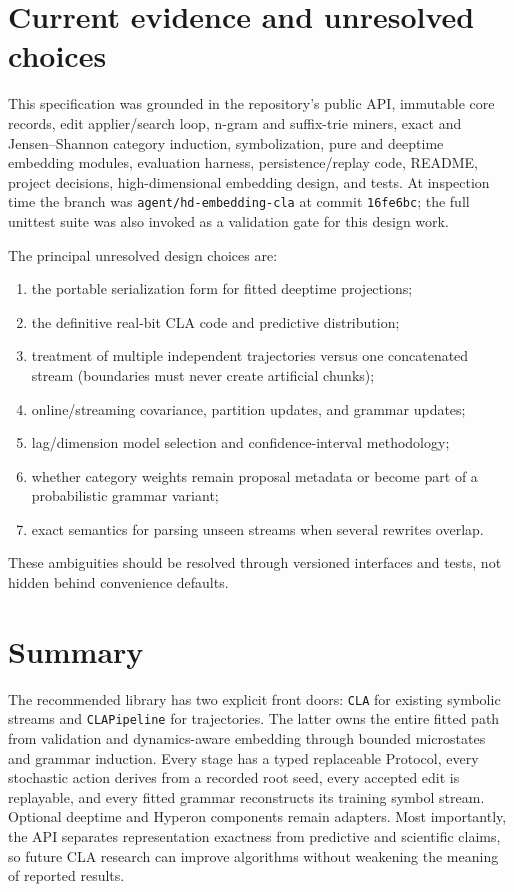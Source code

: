 \documentclass[11pt]{article}
\begin{document}
\section{Current evidence and unresolved choices}

This specification was grounded in the repository's public API, immutable core
records, edit applier/search loop, n-gram and suffix-trie miners, exact and
Jensen--Shannon category induction, symbolization, pure and deeptime embedding
modules, evaluation harness, persistence/replay code, README, project decisions,
high-dimensional embedding design, and tests. At inspection time the branch was
\texttt{agent/hd-embedding-cla} at commit \texttt{16fe6bc}; the full unittest
suite was also invoked as a validation gate for this design work.

The principal unresolved design choices are:
\begin{enumerate}[nosep]
\item the portable serialization form for fitted deeptime projections;
\item the definitive real-bit CLA code and predictive distribution;
\item treatment of multiple independent trajectories versus one concatenated
  stream (boundaries must never create artificial chunks);
\item online/streaming covariance, partition updates, and grammar updates;
\item lag/dimension model selection and confidence-interval methodology;
\item whether category weights remain proposal metadata or become part of a
  probabilistic grammar variant;
\item exact semantics for parsing unseen streams when several rewrites overlap.
\end{enumerate}

These ambiguities should be resolved through versioned interfaces and tests,
not hidden behind convenience defaults.

\section{Summary}

The recommended library has two explicit front doors: \texttt{CLA} for existing
symbolic streams and \texttt{CLAPipeline} for trajectories. The latter owns the
entire fitted path from validation and dynamics-aware embedding through bounded
microstates and grammar induction. Every stage has a typed replaceable Protocol,
every stochastic action derives from a recorded root seed, every accepted edit
is replayable, and every fitted grammar reconstructs its training symbol stream.
Optional deeptime and Hyperon components remain adapters. Most importantly, the
API separates representation exactness from predictive and scientific claims,
so future CLA research can improve algorithms without weakening the meaning of
reported results.
\end{document}
